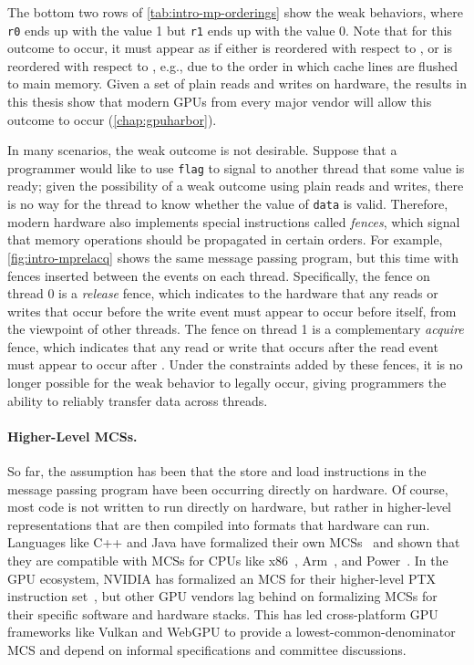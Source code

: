 The bottom two rows of \mytab\ref{tab:intro-mp-orderings} show the weak behaviors, where \texttt{r0} ends up with the value 1 but \texttt{r1} ends up with the value 0. Note that for this outcome to occur, it must appear as if either \introMpEventA is reordered with respect to \introMpEventB, or \introMpEventC is reordered with respect to \introMpEventD, e.g., due to the order in which cache lines are flushed to main memory. Given a set of plain reads and writes on hardware, the results in this thesis show that modern GPUs from every major vendor will allow this outcome to occur (\mychap\ref{chap:gpuharbor}).

In many scenarios, the weak outcome is not desirable. Suppose that a programmer would like to use \texttt{flag} to signal to another thread that some value is ready; given the possibility of a weak outcome using plain reads and writes, there is no way for the thread to know whether the value of \texttt{data} is valid. Therefore, modern hardware also implements special instructions called \textit{fences}, which signal that memory operations should be propagated in certain orders. For example, \myfig\ref{fig:intro-mprelacq} shows the same message passing program, but this time with fences inserted between the events on each thread. Specifically, the fence on thread 0 is a \textit{release} fence, which indicates to the hardware that any reads or writes that occur before the write event \introMpEventB must appear to occur before \introMpEventB itself, from the viewpoint of other threads. The fence on thread 1 is a complementary \textit{acquire} fence, which indicates that any read or write that occurs after the read event \introMpEventC must appear to occur after \introMpEventC. Under the constraints added by these fences, it is no longer possible for the weak behavior to legally occur, giving programmers the ability to reliably transfer data across threads.

\paragraph{Higher-Level MCSs.}
So far, the assumption has been that the store and load instructions in the message passing program have been occurring directly on hardware. Of course, most code is not written to run directly on hardware, but rather in higher-level representations that are then compiled into formats that hardware can run. Languages like C++ and Java have formalized their own MCSs~\cite{batty2011mathematizing,manson2005java} and shown that they are compatible with MCSs for CPUs like x86~\cite{owens2009x86}, Arm~\cite{alglave2009semantics}, and Power~\cite{alglave2009semantics}. In the GPU ecosystem, NVIDIA has formalized an MCS for their higher-level PTX instruction set~\cite{lustig2019ptx}, but other GPU vendors lag behind on formalizing MCSs for their specific software and hardware stacks. This has led cross-platform GPU frameworks like Vulkan and WebGPU to provide a lowest-common-denominator MCS and depend on informal specifications and committee discussions.

